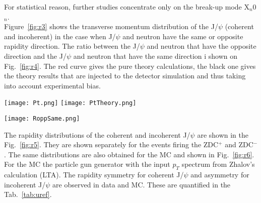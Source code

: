    
    For statistical reason, further studies concentrate only on the break-up mode 
      X$_{n}$0$_{n}$. \\
    Figure~\ref{fig:r3} shows the transverse momentum distribution of the J/$\psi$ 
      (coherent and incoherent) in the case when J/$\psi$ and neutron have the same
      or opposite rapidity direction. 
    The ratio between the J/$\psi$ and neutron that have the opposite direction and
      the J/$\psi$ and neutron that have the same direction i shown on 
      Fig.~\ref{fig:r4}. 
    The red curve gives the pure theory calculations, the black one gives the theory 
      results that are injected to the detector simulation and thus taking into 
      account experimental bias. 
     
    \begin{figure*}[!Hhtb]
      \begin{center}
        \texttt{[image: Pt.png]}
            \texttt{[image: PtTheory.png]}
                 \caption{
        \label{fig:r3}  
         Transverse momentum distribution of the J/$\psi$ when J/$\psi$ and neutron have the same or opposite rapidity direction from data (left) and from theory (right). 
            }
           \end{center}
    \end{figure*}
  
    \begin{figure*}[!Hhtb]
      \begin{center}
        \texttt{[image: RoppSame.png]}\\
                 \caption{
        \label{fig:r4}  
         Ratio between the transverse momentum distribution of the J/$\psi$ when  J/$\psi$ and neutron have the opposite direction and the transverse momentum distribution of the J/$\psi$ when  J/$\psi$ and neutron have the same direction. 
            }
           \end{center}
    \end{figure*}
    
    The rapidity distributions of the coherent and incoherent J/$\psi$ are shown in
      the Fig.~\ref{fig:r5}. 
    They are shown separately for the events firing the ZDC$^{+}$ and ZDC$^{-}$. 
    The same distributions are also obtained for the MC and shown in 
      Fig.~\ref{fig:r6}. 
    For the MC the particle gun generator with the input $p_{T}$ spectrum from 
      Zhalov's  calculation (LTA). 
    The rapidity symmetry for coherent J/$\psi$ and asymmetry for incoherent 
      J/$\psi$ are observed in data and MC. 
    These are quantified in the Tab.~\ref{tab:uref}. 
    
